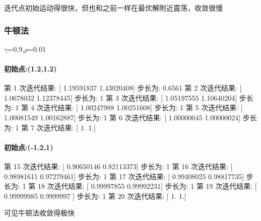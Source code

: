 \documentclass[]{article}
\let\oldparagraph\paragraph
\renewcommand{\paragraph}[1]{\oldparagraph{#1}\mbox{}}
\begin{document}
迭代点初始运动得很快，但也和之前一样在最优解附近震荡，收敛很慢

\subsubsection{牛顿法}\label{header-n65}

\(\gamma\)=0.9,\(\rho\)=0.01

\paragraph{初始点:(1.2,1.2)}\label{header-n68}


第 1 次迭代结果: {[} 1.19591837 1.43020408{]} 步长为: 0.6561 第 2
次迭代结果: {[} 1.0678032 1.12378445{]} 步长为: 1 第 3 次迭代结果: {[}
1.05197555 1.10640204{]} 步长为: 1 第 4 次迭代结果: {[} 1.00247988
1.00251608{]} 步长为: 1 第 5 次迭代结果: {[} 1.00081549 1.00162887{]}
步长为: 1 第 6 次迭代结果: {[} 1.00000045 1.00000024{]} 步长为: 1 第 7
次迭代结果: {[} 1. 1.{]}

\paragraph{初始点:(-1.2,1)}\label{header-n100}


第 15 次迭代结果: {[} 0.90650146 0.82113373{]} 步长为: 1 第 16
次迭代结果: {[} 0.98981611 0.97279461{]} 步长为: 1 第 17 次迭代结果: {[}
0.99408025 0.98817735{]} 步长为: 1 第 18 次迭代结果: {[} 0.99997855
0.99992231{]} 步长为: 1 第 19 次迭代结果: {[} 0.99999985 0.9999997 {]}
步长为: 1 第 20 次迭代结果: {[} 1. 1.{]}

可见牛顿法收敛得极快
\end{document}
